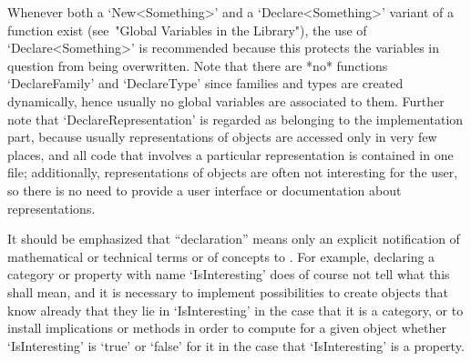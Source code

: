 Whenever both a `New<Something>' and a `Declare<Something>' variant
of a function exist (see~"Global Variables in the Library"),
the use of `Declare<Something>' is recommended
because this protects the variables in question from being overwritten.
Note that there are *no* functions `DeclareFamily' and `DeclareType'
since families and types are created dynamically,
hence usually no global variables are associated to them.
Further note that `DeclareRepresentation' is regarded as belonging to the
implementation part,
because usually representations of objects are accessed only in very
few places, and all code that involves a particular representation
is contained in one file;
additionally, representations of objects are often not interesting
for the user, so there is no need to provide a user interface
or documentation about representations.

It should be emphasized that ``declaration'' means only an explicit
notification of mathematical or technical terms or of concepts to {\GAP}.
For example, declaring a category or property with name `IsInteresting'
does of course not tell {\GAP} what this shall mean,
and it is necessary to implement possibilities to create objects that
know already that they lie in `IsInteresting' in the case that it is a
category, or to install implications or methods in order to
compute for a given object whether `IsInteresting' is `true' or `false'
for it in the case that `IsInteresting' is a property.



